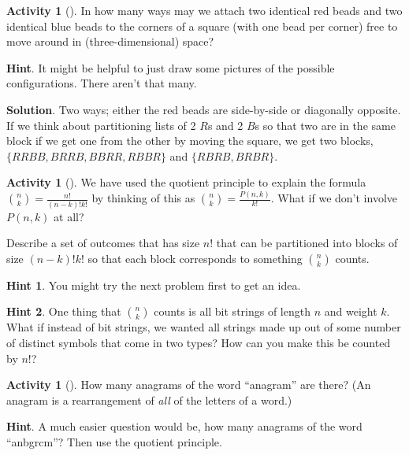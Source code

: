 \documentclass[10pt,]{book}
\theoremstyle{plain}
\theoremstyle{definition}
\theoremstyle{definition}
\theoremstyle{definition}
\newtheorem{activity}[project]{Activity}
\theoremstyle{definition}
\numberwithin{equation}{chapter}
\begin{document}
\begin{activity}[]\label{twocolorsofbeads}
\hypertarget{p-685}{}%
In how many ways may we attach two identical red beads and two identical blue beads to the corners of a square (with one bead per corner) free to move around in (three-dimensional) space?%
\par\smallskip%
\noindent\textbf{Hint}.\hypertarget{hint-46}{}\quad%
\hypertarget{p-686}{}%
It might be helpful to just draw some pictures of the possible configurations. There aren't that many.%
\par\smallskip%
\noindent\textbf{Solution}.\hypertarget{solution-63}{}\quad%
\hypertarget{p-687}{}%
Two ways; either the red beads are side-by-side or diagonally opposite. If we think about partitioning lists of 2 \(R\)s and 2 \(B\)s so that two are in the same block if we get one from the other by moving the square, we get two blocks, \(\{RRBB, BRRB, BBRR, RBBR\}\) and \(\{RBRB, BRBR\}\).%
\end{activity}
\begin{activity}[]\label{activity-57}
\hypertarget{p-688}{}%
We have used the quotient principle to explain the formula \(\binom{n}{k} = \frac{n!}{(n-k)!k!}\) by thinking of this as \(\binom{n}{k} = \frac{P(n,k)}{k!}\).  What if we don't involve \(P(n,k)\) at all?%
\par
\hypertarget{p-689}{}%
Describe a set of outcomes that has size \(n!\) that can be partitioned into blocks of size \((n-k)!k!\) so that each block corresponds to something \(\binom{n}{k}\) counts.%
\par\smallskip%
\noindent\textbf{Hint 1}.\hypertarget{hint-47}{}\quad%
\hypertarget{p-690}{}%
You might try the next problem first to get an idea.%
\par\smallskip%
\noindent\textbf{Hint 2}.\hypertarget{hint-48}{}\quad%
\hypertarget{p-691}{}%
One thing that \(\binom{n}{k}\) counts is all bit strings of length \(n\) and weight \(k\).  What if instead of bit strings, we wanted all strings made up out of some number of distinct symbols that come in two types?  How can you make this be counted by \(n!\)?%
\end{activity}
\begin{activity}[]\label{activity-58}
\hypertarget{p-692}{}%
How many anagrams of the word ``anagram'' are there? (An anagram is a rearrangement of \emph{all} of the letters of a word.)%
\par\smallskip%
\noindent\textbf{Hint}.\hypertarget{hint-49}{}\quad%
\hypertarget{p-693}{}%
A much easier question would be, how many anagrams of the word ``anbgrcm''?  Then use the quotient principle.%
\end{activity}
\typeout{************************************************}
\typeout{************************************************}
\end{document}

